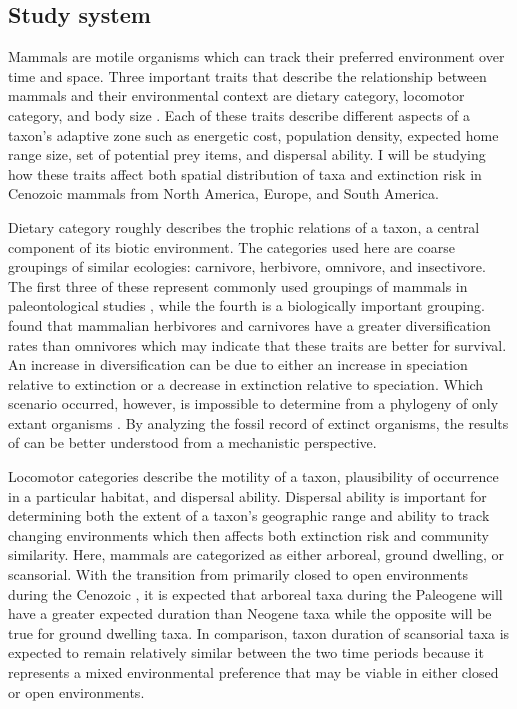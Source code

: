 \documentclass[11pt,letterpaper]{article}
\begin{document}
\subsection{Study system}
Mammals are motile organisms which can track their preferred environment over time and space. Three important traits that describe the relationship between mammals and their environmental context are dietary category, locomotor category, and body size \citep{Smith2004,Smith2008b,Damuth1981a,Damuth1979,Jernvall2004,Lyons2005,Lyons2010}. Each of these traits describe different aspects of a taxon's adaptive zone such as energetic cost, population density, expected home range size, set of potential prey items, and dispersal ability. I will be studying how these traits affect both spatial distribution of taxa and extinction risk in Cenozoic mammals from North America, Europe, and South America.

Dietary category roughly describes the trophic relations of a taxon, a central component of its biotic environment. The categories used here are coarse groupings of similar ecologies: carnivore, herbivore, omnivore, and insectivore. The first three of these represent commonly used groupings of mammals in paleontological studies \citep{Jernvall2004,Price2012}, while the fourth is a biologically important grouping. \citet{Price2012} found that mammalian herbivores and carnivores have a greater diversification rates than omnivores which may indicate that these traits are better for survival. An increase in diversification can be due to either an increase in speciation relative to extinction or a decrease in extinction relative to speciation. Which scenario occurred, however, is impossible to determine from a phylogeny of only extant organisms \citep{Rabosky2010a}. By analyzing the fossil record of extinct organisms, the results of \citet{Price2012} can be better understood from a mechanistic perspective.

Locomotor categories describe the motility of a taxon, plausibility of occurrence in a particular habitat, and dispersal ability. Dispersal ability is important for determining both the extent of a taxon's geographic range and ability to track changing environments \citep{Birand2012,Jablonski2006a,Gaston2009} which then affects both extinction risk and community similarity. Here, mammals are categorized as either arboreal, ground dwelling, or scansorial. With the transition from primarily closed to open environments during the Cenozoic \citep{Blois2009,Janis1993a,Stromberg2005,Stromberg2013}, it is expected that arboreal taxa during the Paleogene will have a greater expected duration than Neogene taxa while the opposite will be true for ground dwelling taxa. In comparison, taxon duration of scansorial taxa is expected to remain relatively similar between the two time periods because it represents a mixed environmental preference that may be viable in either closed or open environments. 
\end{document}
